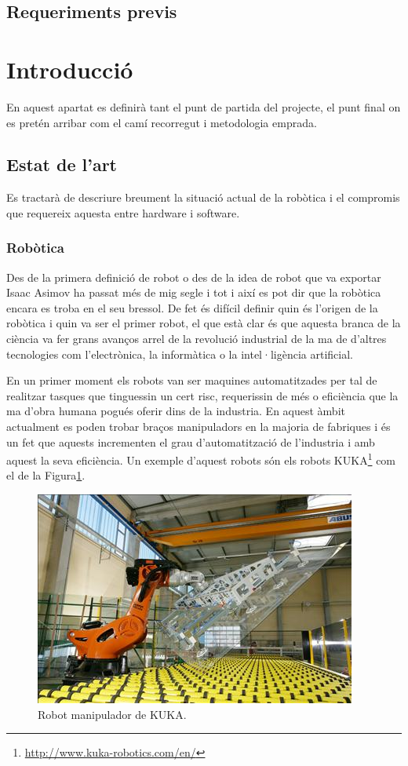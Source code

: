 \documentclass[12pt,a4paper,final,twoside]{article}
\begin{document}
 

\subsection{Requeriments previs}
\section{Introducció}
En aquest apartat es definirà tant el punt de partida del projecte, el punt final on es pretén arribar com el camí recorregut i metodologia emprada. 
\subsection{Estat de l'art}
\label{estatdelart}
Es tractarà de descriure breument la situació actual de la robòtica i el compromis que requereix aquesta entre hardware i software.
\subsubsection{Robòtica}
Des de la primera definició de robot o des de la idea de robot que va exportar Isaac Asimov ha passat més de mig segle i tot i així es pot dir que la robòtica encara es troba en el seu bressol. De fet és difícil definir quin és l'origen de la robòtica i quin va ser el primer robot, el que està clar és que aquesta branca de la ciència va fer grans avanços arrel de la revolució industrial de la ma de d'altres tecnologies com l'electrònica, la informàtica o la intel·ligència artificial.

En un primer moment els robots van ser maquines automatitzades per tal de realitzar tasques que tinguessin un cert risc, requerissin de més  o eficiència que la ma d'obra humana pogués oferir dins de la industria. En aquest àmbit actualment es poden trobar braços manipuladors en la majoria de fabriques i és un fet que aquests incrementen el grau d'automatització de l'industria i amb aquest la seva eficiència\cite{libroblanco}. Un exemple d'aquest robots són els robots KUKA\footnote{\url{http://www.kuka-robotics.com/en/}} com el de la Figura\ref{fig:kuka}.
 
\begin{figure}[h!]
	\centering
    \includegraphics[scale=3]	{images/kuka.jpg}
	 \caption{Robot manipulador de KUKA.}
  \label{fig:kuka}
\end{figure}
\end{document}
